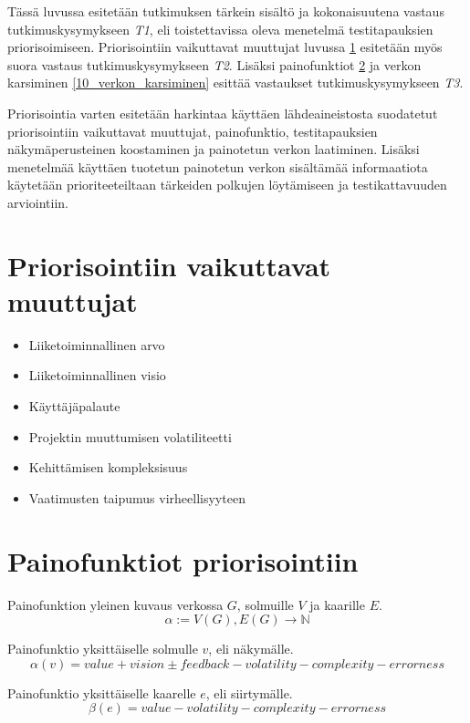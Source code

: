 Tässä luvussa esitetään tutkimuksen tärkein sisältö ja kokonaisuutena vastaus tutkimuskysymykseen \emph{T1}, eli toistettavissa oleva menetelmä testitapauksien priorisoimiseen.
Priorisointiin vaikuttavat muuttujat luvussa \ref{10_priorisointiin_vaikuttavat_muuttujat} esitetään myös suora vastaus tutkimuskysymykseen \emph{T2}.
Lisäksi painofunktiot \ref{10_painofunktiot_priorisointiin} ja verkon karsiminen \ref{10_verkon_karsiminen} esittää vastaukset tutkimuskysymykseen \emph{T3}.

Priorisointia varten esitetään harkintaa käyttäen lähdeaineistosta suodatetut priorisointiin vaikuttavat muuttujat, painofunktio, testitapauksien näkymäperusteinen koostaminen ja painotetun verkon laatiminen.
Lisäksi menetelmää käyttäen tuotetun painotetun verkon sisältämää informaatiota käytetään prioriteeteiltaan tärkeiden polkujen löytämiseen ja testikattavuuden arviointiin.

\section{Priorisointiin vaikuttavat muuttujat} \label{10_priorisointiin_vaikuttavat_muuttujat}

\begin{itemize}
  \item Liiketoiminnallinen arvo
  \item Liiketoiminnallinen visio
  \item Käyttäjäpalaute
  \item Projektin muuttumisen volatiliteetti
  \item Kehittämisen kompleksisuus
  \item Vaatimusten taipumus virheellisyyteen
\end{itemize}

\section{Painofunktiot priorisointiin} \label{10_painofunktiot_priorisointiin}

Painofunktion yleinen kuvaus verkossa \(G\), solmuille \(V\) ja kaarille \(E\).
\[\alpha := V(G), E(G) \rightarrow \mathbb{N}\]

Painofunktio yksittäiselle solmulle \(v\), eli näkymälle.
\[\alpha(v) = value + vision \pm feedback - volatility - complexity - errorness\]

Painofunktio yksittäiselle kaarelle \(e\), eli siirtymälle.
\[\beta(e) = value - volatility - complexity - errorness\]

